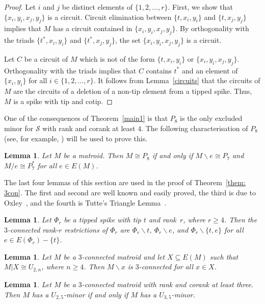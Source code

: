 \documentclass[11pt]{amsart}
\newtheorem{lemma}[theorem]{Lemma}
\numberwithin{equation}{section} %
\newcommand{\delete}{\backslash}
\newcommand{\cS}{\mathcal{S}}
\begin{document}
\begin{proof}
Let $i$ and $j$ be distinct elements of $\{1,2,\ldots,r\}$. First, we show that $\{x_i,y_i,x_j,y_j\}$ is a circuit. Circuit elimination between $\{t,x_i,y_i\}$ and $\{t,x_j,y_j\}$ implies that $M$ has a circuit contained in $\{x_i,y_i,x_j,y_j\}$. By orthogonality with the triads $\{t^*,x_i,y_i\}$ and $\{t^*,x_j,y_j\}$, the set $\{x_i,y_i,x_j,y_j\}$ is a circuit.

Let $C$ be a circuit of $M$ which is not of the form $\{t,x_i,y_i\}$ or $\{x_i,y_i,x_j,y_j\}$. Orthogonality with the triads implies that $C$ contains $t^*$ and an element of $\{x_i,y_i\}$ for all $i \in \{1,2,\ldots,r\}$. It follows from Lemma~\ref{circuits} that the circuits of $M$ are the circuits of a deletion of a non-tip element from a tipped spike. Thus, $M$ is a spike with tip and cotip.
\end{proof}

One of the consequences of Theorem~\ref{main1} is that $P_8$ is the only excluded minor for $\cS$ with rank and corank at least $4$. The following characterisation of $P_8$ (see, for example, \cite[p.\ 651]{ox11}) will be used to prove this.

\begin{lemma} 
Let $M$ be a matroid. Then $M \cong P_8$ if and only if $M \backslash e \cong P_7$ and $M / e \cong P_7^*$ for all $e \in E(M)$.
\label{lem: p8}
\end{lemma}

The last four lemmas of this section are used in the proof of Theorem~\ref{them: 3con}. The first and second are well known and easily proved, the third is due to Oxley~\cite{ox89}, and the fourth is Tutte's Triangle Lemma~\cite{tut66}.

\begin{lemma}
\label{3conspike}
Let $\Phi_r$ be a tipped spike with tip $t$ and rank~$r$, where $r\ge 4$. Then the $3$-connected rank-$r$ restrictions of $\Phi_r$ are $\Phi_r\backslash t$, $\Phi_r\backslash e$, and $\Phi_r\backslash \{t, e\}$ for all $e\in E(\Phi_r)-\{t\}$.
\end{lemma}

\begin{lemma}
\label{segdelete}
Let $M$ be a $3$-connected matroid and let $X\subseteq E(M)$ such that $M|X\cong U_{2, n}$, where $n\geq 4$. Then $M\delete x$ is $3$-connected for all $x\in X$.
\end{lemma}

\begin{lemma}
\label{lem: U25 U35}
Let $M$ be a $3$-connected matroid with rank and corank at least three. Then $M$ has a $U_{2, 5}$-minor if and only if $M$ has a $U_{3, 5}$-minor.
\end{lemma}
\end{document}
